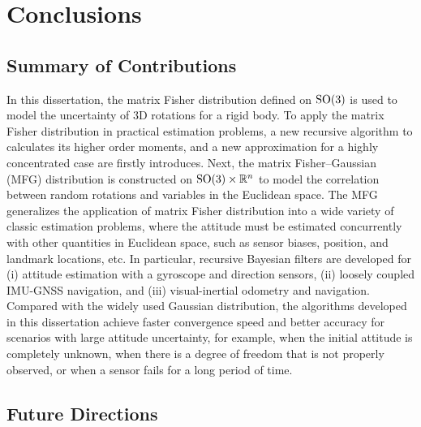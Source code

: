 
\chapter{Conclusions} \label{chap:conclusion}

\section{Summary of Contributions}

In this dissertation, the matrix Fisher distribution defined on $\mathrm{SO}(3)$ is used to model the uncertainty of 3D rotations for a rigid body.
To apply the matrix Fisher distribution in practical estimation problems, a new recursive algorithm to calculates its higher order moments, and a new approximation for a highly concentrated case are firstly introduces.
Next, the matrix Fisher--Gaussian (MFG) distribution is constructed on $\mathrm{SO}(3)\times \mathbb{R}^n$ to model the correlation between random rotations and variables in the Euclidean space.
The MFG generalizes the application of matrix Fisher distribution into a wide variety of classic estimation problems, where the attitude must be estimated concurrently with other quantities in Euclidean space, such as sensor biases, position, and landmark locations, etc.
In particular, recursive Bayesian filters are developed for (i) attitude estimation with a gyroscope and direction sensors, (ii) loosely coupled IMU-GNSS navigation, and (iii) visual-inertial odometry and navigation.
Compared with the widely used Gaussian distribution, the algorithms developed in this dissertation achieve faster convergence speed and better accuracy for scenarios with large attitude uncertainty, for example, when the initial attitude is completely unknown, when there is a degree of freedom that is not properly observed, or when a sensor fails for a long period of time.

\section{Future Directions}

